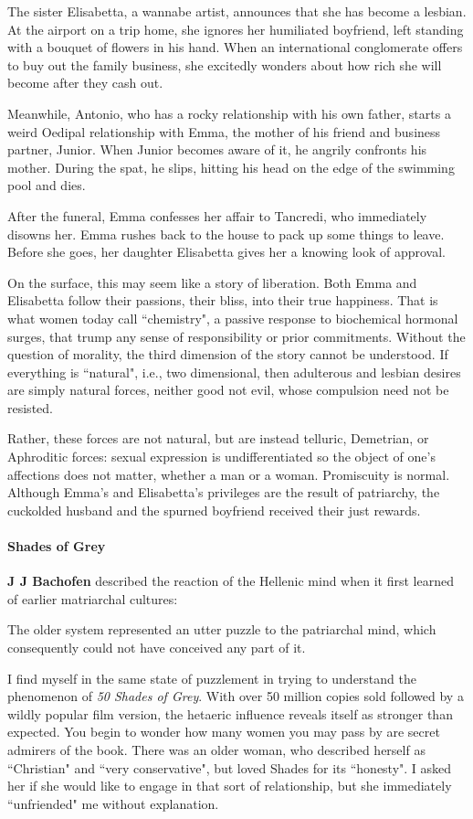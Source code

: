 The sister Elisabetta, a wannabe artist, announces that she has become a lesbian. At the airport on a trip home, she ignores her humiliated boyfriend, left standing with a bouquet of flowers in his hand. When an international conglomerate offers to buy out the family business, she excitedly wonders about how rich she will become after they cash out.

Meanwhile, Antonio, who has a rocky relationship with his own father, starts a weird Oedipal relationship with Emma, the mother of his friend and business partner, Junior. When Junior becomes aware of it, he angrily confronts his mother. During the spat, he slips, hitting his head on the edge of the swimming pool and dies.

After the funeral, Emma confesses her affair to Tancredi, who immediately disowns her. Emma rushes back to the house to pack up some things to leave. Before she goes, her daughter Elisabetta gives her a knowing look of approval.

On the surface, this may seem like a story of liberation. Both Emma and Elisabetta follow their passions, their bliss, into their true happiness. That is what women today call ``chemistry", a passive response to biochemical hormonal surges, that trump any sense of responsibility or prior commitments. Without the question of morality, the third dimension of the story cannot be understood. If everything is ``natural", i.e., two dimensional, then adulterous and lesbian desires are simply natural forces, neither good not evil, whose compulsion need not be resisted.

Rather, these forces are not natural, but are instead telluric, Demetrian, or Aphroditic forces: sexual expression is undifferentiated so the object of one's affections does not matter, whether a man or a woman. Promiscuity is normal. Although Emma's and Elisabetta's privileges are the result of patriarchy, the cuckolded husband and the spurned boyfriend received their just rewards.

\paragraph{Shades of Grey}
\textbf{J J Bachofen} described the reaction of the Hellenic mind when it first learned of earlier matriarchal cultures:

\begin{quotex}
The older system represented an utter puzzle to the patriarchal mind, which consequently could not have conceived any part of it. 

\end{quotex}
I find myself in the same state of puzzlement in trying to understand the phenomenon of \emph{50 Shades of Grey}. With over 50 million copies sold followed by a wildly popular film version, the hetaeric influence reveals itself as stronger than expected. You begin to wonder how many women you may pass by are secret admirers of the book. There was an older woman, who described herself as ``Christian" and ``very conservative", but loved Shades for its ``honesty". I asked her if she would like to engage in that sort of relationship, but she immediately ``unfriended" me without explanation.

